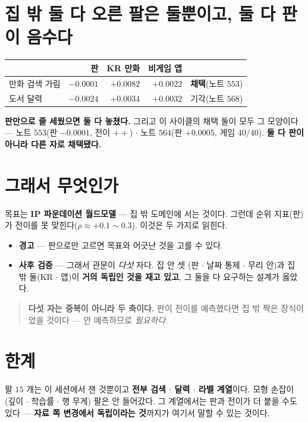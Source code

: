 \documentclass[11pt]{article}
\begin{document}
\section{집 밖 둘 다 오른 팔은 둘뿐이고, 둘 다 판이 음수다}

\begin{center}
\begin{tabular}{lrrrl}
\hline
 & 판 & KR 만화 & 비게임 앱 & \\
\hline
만화 검색 가림 & $-0.0001$ & $+0.0082$ & $+0.0022$ & \textbf{채택}(노트 $553$) \\
도서 달력 & $-0.0024$ & $+0.0034$ & $+0.0032$ & 기각(노트 $568$) \\
\hline
\end{tabular}
\end{center}

\textbf{판만으로 줄 세웠으면 둘 다 놓쳤다.} 그리고 이 사이클의 채택 둘이
모두 그 모양이다 --- 노트 $553$(판 $-0.0001$, 전이 $++$) $\cdot$ 노트
$564$(판 $+0.0005$, 게임 $40/40$). \textbf{둘 다 판이 아니라 다른 자로
채택됐다.}

\section{그래서 무엇인가}

목표는 \textbf{IP 파운데이션 월드모델} --- 집 밖 도메인에 서는 것이다.
그런데 순위 지표(판)가 전이를 못 맞힌다($\rho \approx +0.1\!\sim\!0.3$).
이것은 두 가지로 읽힌다.

\begin{itemize}
\item \textbf{경고} --- 판으로만 고르면 목표와 어긋난 것을 고를 수 있다.
\item \textbf{사후 검증} --- 그래서 관문이 \emph{다섯} 자다. 집 안 셋
(판 $\cdot$ 날짜 통제 $\cdot$ 무리 안)과 집 밖 둘(KR $\cdot$ 앱)이
\textbf{거의 독립인 것을 재고 있고}, 그 둘을 다 요구하는 설계가 옳았다.
\end{itemize}

\begin{quote}
\textbf{다섯 자는 중복이 아니라 두 축이다.} 판이 전이를 예측했다면 집 밖
짝은 장식이었을 것이다 --- 안 예측하므로 \emph{필요하다}.
\end{quote}

\section*{한계}

팔 $15$ 개는 이 세션에서 잰 것뿐이고 \textbf{전부 검색 $\cdot$ 달력 $\cdot$
라벨 계열}이다. 모형 손잡이(깊이 $\cdot$ 학습률 $\cdot$ 행 무게) 팔은 안
들어갔다. 그 계열에서는 판과 전이가 더 붙을 수도 있다 --- \textbf{자료 쪽
변경에서 독립이라는 것}까지가 여기서 말할 수 있는 것이다.
\end{document}
